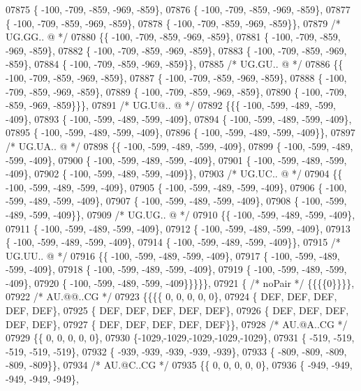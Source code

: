 \begin{DoxyCode}
07875 \{ -100, -709, -859, -969, -859\},
07876 \{ -100, -709, -859, -969, -859\},
07877 \{ -100, -709, -859, -969, -859\},
07878 \{ -100, -709, -859, -969, -859\}\},
07879 \textcolor{comment}{/* UG.GG.. @ */}
07880 \{\{ -100, -709, -859, -969, -859\},
07881 \{ -100, -709, -859, -969, -859\},
07882 \{ -100, -709, -859, -969, -859\},
07883 \{ -100, -709, -859, -969, -859\},
07884 \{ -100, -709, -859, -969, -859\}\},
07885 \textcolor{comment}{/* UG.GU.. @ */}
07886 \{\{ -100, -709, -859, -969, -859\},
07887 \{ -100, -709, -859, -969, -859\},
07888 \{ -100, -709, -859, -969, -859\},
07889 \{ -100, -709, -859, -969, -859\},
07890 \{ -100, -709, -859, -969, -859\}\}\},
07891 \textcolor{comment}{/* UG.U@.. @ */}
07892 \{\{\{ -100, -599, -489, -599, -409\},
07893 \{ -100, -599, -489, -599, -409\},
07894 \{ -100, -599, -489, -599, -409\},
07895 \{ -100, -599, -489, -599, -409\},
07896 \{ -100, -599, -489, -599, -409\}\},
07897 \textcolor{comment}{/* UG.UA.. @ */}
07898 \{\{ -100, -599, -489, -599, -409\},
07899 \{ -100, -599, -489, -599, -409\},
07900 \{ -100, -599, -489, -599, -409\},
07901 \{ -100, -599, -489, -599, -409\},
07902 \{ -100, -599, -489, -599, -409\}\},
07903 \textcolor{comment}{/* UG.UC.. @ */}
07904 \{\{ -100, -599, -489, -599, -409\},
07905 \{ -100, -599, -489, -599, -409\},
07906 \{ -100, -599, -489, -599, -409\},
07907 \{ -100, -599, -489, -599, -409\},
07908 \{ -100, -599, -489, -599, -409\}\},
07909 \textcolor{comment}{/* UG.UG.. @ */}
07910 \{\{ -100, -599, -489, -599, -409\},
07911 \{ -100, -599, -489, -599, -409\},
07912 \{ -100, -599, -489, -599, -409\},
07913 \{ -100, -599, -489, -599, -409\},
07914 \{ -100, -599, -489, -599, -409\}\},
07915 \textcolor{comment}{/* UG.UU.. @ */}
07916 \{\{ -100, -599, -489, -599, -409\},
07917 \{ -100, -599, -489, -599, -409\},
07918 \{ -100, -599, -489, -599, -409\},
07919 \{ -100, -599, -489, -599, -409\},
07920 \{ -100, -599, -489, -599, -409\}\}\}\}\},
07921 \{ \textcolor{comment}{/* noPair */} \{\{\{\{0\}\}\}\},
07922 \textcolor{comment}{/* AU.@@..CG */}
07923 \{\{\{\{    0,    0,    0,    0,    0\},
07924 \{  DEF,  DEF,  DEF,  DEF,  DEF\},
07925 \{  DEF,  DEF,  DEF,  DEF,  DEF\},
07926 \{  DEF,  DEF,  DEF,  DEF,  DEF\},
07927 \{  DEF,  DEF,  DEF,  DEF,  DEF\}\},
07928 \textcolor{comment}{/* AU.@A..CG */}
07929 \{\{    0,    0,    0,    0,    0\},
07930 \{-1029,-1029,-1029,-1029,-1029\},
07931 \{ -519, -519, -519, -519, -519\},
07932 \{ -939, -939, -939, -939, -939\},
07933 \{ -809, -809, -809, -809, -809\}\},
07934 \textcolor{comment}{/* AU.@C..CG */}
07935 \{\{    0,    0,    0,    0,    0\},
07936 \{ -949, -949, -949, -949, -949\},

\end{DoxyCode}
